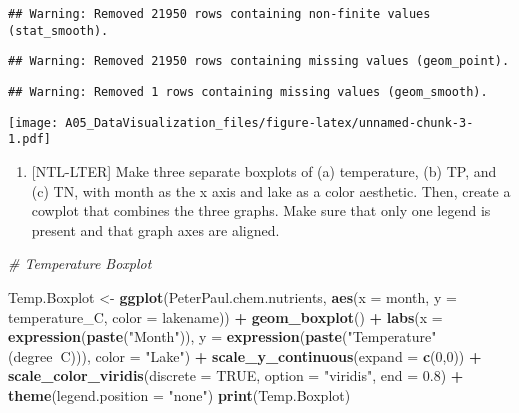 \documentclass[]{article}
\newenvironment{Shaded}{\begin{snugshade}}{\end{snugshade}}
\newcommand{\KeywordTok}[1]{\textcolor[rgb]{0.13,0.29,0.53}{\textbf{#1}}}
\newcommand{\DataTypeTok}[1]{\textcolor[rgb]{0.13,0.29,0.53}{#1}}
\newcommand{\DecValTok}[1]{\textcolor[rgb]{0.00,0.00,0.81}{#1}}
\newcommand{\FloatTok}[1]{\textcolor[rgb]{0.00,0.00,0.81}{#1}}
\newcommand{\StringTok}[1]{\textcolor[rgb]{0.31,0.60,0.02}{#1}}
\newcommand{\CommentTok}[1]{\textcolor[rgb]{0.56,0.35,0.01}{\textit{#1}}}
\newcommand{\OtherTok}[1]{\textcolor[rgb]{0.56,0.35,0.01}{#1}}
\newcommand{\OperatorTok}[1]{\textcolor[rgb]{0.81,0.36,0.00}{\textbf{#1}}}
\newcommand{\NormalTok}[1]{#1}
\providecommand{\tightlist}{%
  \setlength{\itemsep}{0pt}\setlength{\parskip}{0pt}}
\begin{document}
\begin{verbatim}
## Warning: Removed 21950 rows containing non-finite values (stat_smooth).
\end{verbatim}

\begin{verbatim}
## Warning: Removed 21950 rows containing missing values (geom_point).
\end{verbatim}

\begin{verbatim}
## Warning: Removed 1 rows containing missing values (geom_smooth).
\end{verbatim}

\texttt{[image: A05\_DataVisualization\_files/figure-latex/unnamed-chunk-3-1.pdf]}

\begin{enumerate}
\def\labelenumi{\arabic{enumi}.}
\setcounter{enumi}{4}
\tightlist
\item
  {[}NTL-LTER{]} Make three separate boxplots of (a) temperature, (b)
  TP, and (c) TN, with month as the x axis and lake as a color
  aesthetic. Then, create a cowplot that combines the three graphs. Make
  sure that only one legend is present and that graph axes are aligned.
\end{enumerate}

\begin{Shaded}
\begin{Highlighting}[]
\CommentTok{# Temperature Boxplot}

\NormalTok{Temp.Boxplot <-}\StringTok{ }
\StringTok{  }\KeywordTok{ggplot}\NormalTok{(PeterPaul.chem.nutrients, }\KeywordTok{aes}\NormalTok{(}\DataTypeTok{x =}\NormalTok{ month, }\DataTypeTok{y =}\NormalTok{ temperature_C, }\DataTypeTok{color =}\NormalTok{ lakename)) }\OperatorTok{+}
\StringTok{  }\KeywordTok{geom_boxplot}\NormalTok{() }\OperatorTok{+}
\StringTok{  }\KeywordTok{labs}\NormalTok{(}\DataTypeTok{x =} \KeywordTok{expression}\NormalTok{(}\KeywordTok{paste}\NormalTok{(}\StringTok{"Month"}\NormalTok{)),}
       \DataTypeTok{y =} \KeywordTok{expression}\NormalTok{(}\KeywordTok{paste}\NormalTok{(}\StringTok{"Temperature"}\NormalTok{ (degree}\OperatorTok{~}\NormalTok{C))), }\DataTypeTok{color =} \StringTok{"Lake"}\NormalTok{) }\OperatorTok{+}
\StringTok{  }\KeywordTok{scale_y_continuous}\NormalTok{(}\DataTypeTok{expand =} \KeywordTok{c}\NormalTok{(}\DecValTok{0}\NormalTok{,}\DecValTok{0}\NormalTok{)) }\OperatorTok{+}\StringTok{ }
\StringTok{  }\KeywordTok{scale_color_viridis}\NormalTok{(}\DataTypeTok{discrete =} \OtherTok{TRUE}\NormalTok{, }\DataTypeTok{option =} \StringTok{"viridis"}\NormalTok{, }\DataTypeTok{end =} \FloatTok{0.8}\NormalTok{) }\OperatorTok{+}
\StringTok{  }\KeywordTok{theme}\NormalTok{(}\DataTypeTok{legend.position =} \StringTok{"none"}\NormalTok{)}
\KeywordTok{print}\NormalTok{(Temp.Boxplot)}
\end{Highlighting}
\end{Shaded}
\end{document}
